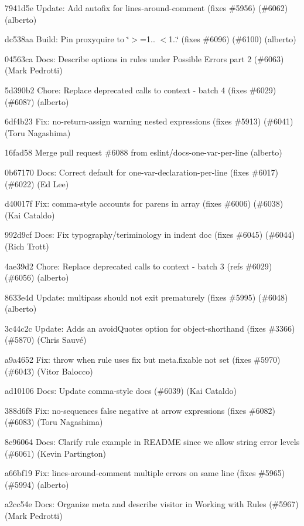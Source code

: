\begin{DoxyItemize}
\item 7941d5e Update\+: Add autofix for {\ttfamily lines-\/around-\/comment} (fixes \#5956) (\#6062) (alberto)
\item dc538aa Build\+: Pin proxyquire to \char`\"{}$>$=1.. $<$1..\char`\"{} (fixes \#6096) (\#6100) (alberto)
\item 04563ca Docs\+: Describe options in rules under Possible Errors part 2 (\#6063) (Mark Pedrotti)
\item 5d390b2 Chore\+: Replace deprecated calls to context -\/ batch 4 (fixes \#6029) (\#6087) (alberto)
\item 6df4b23 Fix\+: {\ttfamily no-\/return-\/assign} warning nested expressions (fixes \#5913) (\#6041) (Toru Nagashima)
\item 16fad58 Merge pull request \#6088 from eslint/docs-\/one-\/var-\/per-\/line (alberto)
\item 0b67170 Docs\+: Correct default for {\ttfamily one-\/var-\/declaration-\/per-\/line} (fixes \#6017) (\#6022) (Ed Lee)
\item d40017f Fix\+: comma-\/style accounts for parens in array (fixes \#6006) (\#6038) (Kai Cataldo)
\item 992d9cf Docs\+: Fix typography/teriminology in indent doc (fixes \#6045) (\#6044) (Rich Trott)
\item 4ae39d2 Chore\+: Replace deprecated calls to context -\/ batch 3 (refs \#6029) (\#6056) (alberto)
\item 8633e4d Update\+: multipass should not exit prematurely (fixes \#5995) (\#6048) (alberto)
\item 3c44c2c Update\+: Adds an avoid\+Quotes option for object-\/shorthand (fixes \#3366) (\#5870) (Chris Sauvé)
\item a9a4652 Fix\+: throw when rule uses {\ttfamily fix} but {\ttfamily meta.\+fixable} not set (fixes \#5970) (\#6043) (Vitor Balocco)
\item ad10106 Docs\+: Update comma-\/style docs (\#6039) (Kai Cataldo)
\item 388d6f8 Fix\+: {\ttfamily no-\/sequences} false negative at arrow expressions (fixes \#6082) (\#6083) (Toru Nagashima)
\item 8e96064 Docs\+: Clarify rule example in R\+E\+A\+D\+ME since we allow string error levels (\#6061) (Kevin Partington)
\item a66bf19 Fix\+: {\ttfamily lines-\/around-\/comment} multiple errors on same line (fixes \#5965) (\#5994) (alberto)
\item a2cc54e Docs\+: Organize meta and describe visitor in Working with Rules (\#5967) (Mark Pedrotti)

\end{DoxyItemize}
